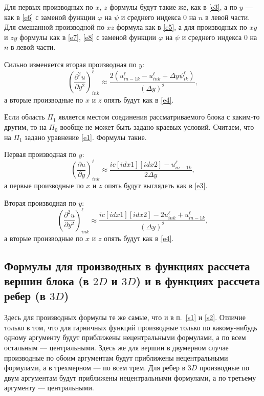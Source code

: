 \documentclass[a4paper]{article}
\begin{document}
Для первых производных по $x$, $z$ формулы будут такие же, как в \eqref{e3}, а по $y$ --- как в \eqref{e6} с заменой функции $\varphi$ на $\psi$ и среднего индекса $0$ на $n$ в левой части. Для смешанной производной по $xz$ формула как в \eqref{e5}, а для производных по $xy$ и $zy$ формулы как в \eqref{e7}, \eqref{e8} с заменой функции $\varphi$ на $\psi$ и среднего индекса $0$ на $n$ в левой части.

Сильно изменяется вторая производная по $y$:
\begin{equation*}
\left(\frac{\partial^2 u}{\partial y^2}\right)^{\ell}_{ink} \approx \frac{2\left(u^{\ell}_{in-1k} - u^{\ell}_{ink} + \Delta y  \psi^{\ell}_{ik}\right)}{(\Delta y)^2},
\end{equation*}
а вторые производные по $x$ и $z$ опять будут как в \eqref{e4}.

Если область $\Pi_1$ является местом соединения рассматриваемого блока с каким-то другим, то на $\Pi_0$ вообще не может быть задано краевых условий. Считаем, что на $\Pi_1$ задано уравнение \eqref{e1}. Формулы такие.

Первая производная по $y$:
\begin{equation*}
\left(\frac{\partial u}{\partial y}\right)^{\ell}_{ink} \approx \frac{ic[idx1][idx2] - u^{\ell}_{in-1k}}{2\Delta y},
\end{equation*}
а первые производные по $x$ и $z$ опять будут выглядеть как в \eqref{e3}.

Вторая производная по $y$:
\begin{equation*}
\left(\frac{\partial^2 u}{\partial y^2}\right)^{\ell}_{ink} \approx \frac{ic[idx1][idx2] - 2u^{\ell}_{ink} + u^{\ell}_{in-1k}}{(\Delta y)^2},
\end{equation*}
а вторые производные по $x$ и $z$ опять будут как в \eqref{e4}.

\subsection{\Large Формулы для производных в функциях рассчета вершин блока (в $2D$ и $3D$) и в функциях рассчета ребер (в $3D$)}

Здесь для производных формулы те же самые, что и в п.~\ref{s1} и \ref{s2}. Отличие только в том, что для гарничных функций производные только по какому-нибудь одному аргументу будут приближены нецентральными формулами, а по всем остальным --- центральными. Здесь же для вершин в двумерном случае производные по обоим аргументам будут приближены нецентральными формулами, а в трехмерном --- по всем трем. Для ребер в $3D$ производные по двум аргументам будут приближены нецентральными формулами, а по третьему аргументу --- центральными.
\end{document}
